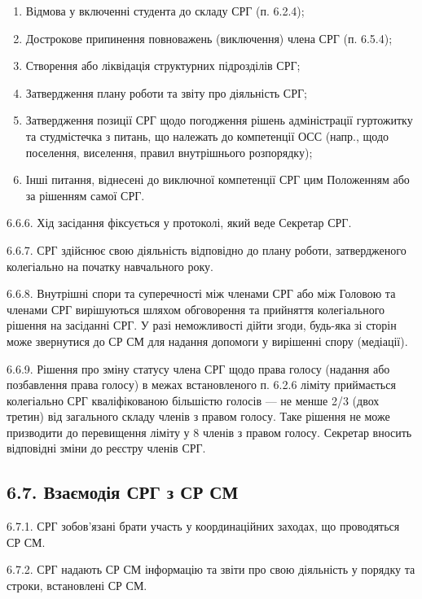         \begin{enumerate}[label=\alph*)]
            \item Відмова у включенні студента до складу СРГ (п. 6.2.4);
            \item Дострокове припинення повноважень (виключення) члена СРГ (п. 6.5.4);
            \item Створення або ліквідація структурних підрозділів СРГ;
            \item Затвердження плану роботи та звіту про діяльність СРГ;
            \item Затвердження позиції СРГ щодо погодження рішень адміністрації гуртожитку та студмістечка з питань, що належать до компетенції ОСС (напр., щодо поселення, виселення, правил внутрішнього розпорядку);
            \item Інші питання, віднесені до виключної компетенції СРГ цим Положенням або за рішенням самої СРГ.
        \end{enumerate}

    6.6.6. Хід засідання фіксується у протоколі, який веде Секретар СРГ.

    6.6.7. СРГ здійснює свою діяльність відповідно до плану роботи, затвердженого колегіально на початку навчального року.

    6.6.8. Внутрішні спори та суперечності між членами СРГ або між Головою та членами СРГ вирішуються шляхом обговорення та прийняття колегіального рішення на засіданні СРГ. У разі неможливості дійти згоди, будь-яка зі сторін може звернутися до СР СМ для надання допомоги у вирішенні спору (медіації).

    6.6.9. Рішення про зміну статусу члена СРГ щодо права голосу (надання або позбавлення права голосу) в межах встановленого п. 6.2.6 ліміту приймається колегіально СРГ кваліфікованою більшістю голосів — не менше 2/3 (двох третин) від загального складу членів з правом голосу. Таке рішення не може призводити до перевищення ліміту у 8 членів з правом голосу. Секретар вносить відповідні зміни до реєстру членів СРГ.

\subsection*{6.7. Взаємодія СРГ з СР СМ}
    6.7.1. СРГ зобов'язані брати участь у координаційних заходах, що проводяться СР СМ.

    6.7.2. СРГ надають СР СМ інформацію та звіти про свою діяльність у порядку та строки, встановлені СР СМ.


